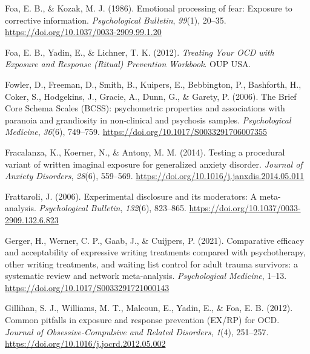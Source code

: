 \documentclass[
  man,floatsintext]{apa7}
\newlength{\cslhangindent}
\newlength{\cslentryspacingunit} %
\newenvironment{CSLReferences}[2] %
 {%
  \setlength{\parindent}{0pt}
  \ifodd #1
  \let\oldpar\par
  \def\par{\hangindent=\cslhangindent\oldpar}
  \fi
  \setlength{\parskip}{#2\cslentryspacingunit}
 }%
 {}
\begin{document}
\begin{CSLReferences}{1}{0}
\leavevmode{}%
Foa, E. B., \& Kozak, M. J. (1986). Emotional processing of fear: Exposure to corrective information. \emph{Psychological Bulletin}, \emph{99}(1), 20--35. \url{https://doi.org/10.1037/0033-2909.99.1.20}

\leavevmode{}%
Foa, E. B., Yadin, E., \& Lichner, T. K. (2012). \emph{Treating Your OCD with Exposure and Response (Ritual) Prevention Workbook}. OUP USA.

\leavevmode{}%
Fowler, D., Freeman, D., Smith, B., Kuipers, E., Bebbington, P., Bashforth, H., Coker, S., Hodgekins, J., Gracie, A., Dunn, G., \& Garety, P. (2006). The Brief Core Schema Scales (BCSS): psychometric properties and associations with paranoia and grandiosity in non-clinical and psychosis samples. \emph{Psychological Medicine}, \emph{36}(6), 749--759. \url{https://doi.org/10.1017/S0033291706007355}

\leavevmode{}%
Fracalanza, K., Koerner, N., \& Antony, M. M. (2014). Testing a procedural variant of written imaginal exposure for generalized anxiety disorder. \emph{Journal of Anxiety Disorders}, \emph{28}(6), 559--569. \url{https://doi.org/10.1016/j.janxdis.2014.05.011}

\leavevmode{}%
Frattaroli, J. (2006). Experimental disclosure and its moderators: A meta-analysis. \emph{Psychological Bulletin}, \emph{132}(6), 823--865. \url{https://doi.org/10.1037/0033-2909.132.6.823}

\leavevmode{}%
Gerger, H., Werner, C. P., Gaab, J., \& Cuijpers, P. (2021). Comparative efficacy and acceptability of expressive writing treatments compared with psychotherapy, other writing treatments, and waiting list control for adult trauma survivors: a systematic review and network meta-analysis. \emph{Psychological Medicine}, 1--13. \url{https://doi.org/10.1017/S0033291721000143}

\leavevmode{}%
Gillihan, S. J., Williams, M. T., Malcoun, E., Yadin, E., \& Foa, E. B. (2012). Common pitfalls in exposure and response prevention (EX/RP) for OCD. \emph{Journal of Obsessive-Compulsive and Related Disorders}, \emph{1}(4), 251--257. \url{https://doi.org/10.1016/j.jocrd.2012.05.002}


\end{CSLReferences}
\end{document}
